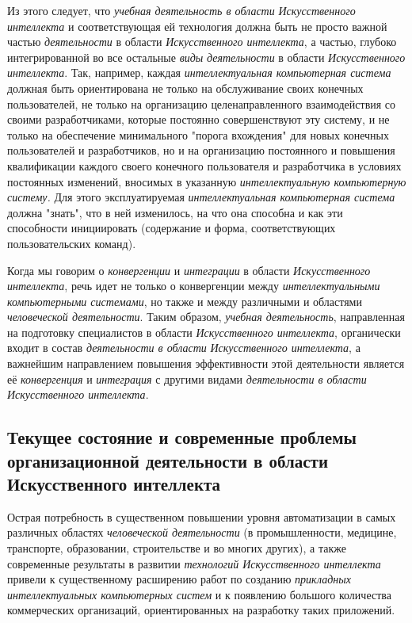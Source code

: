 Из этого следует, что \textit{учебная деятельность в области} \textit{Искусственного интеллекта} и соответствующая ей технология должна быть не просто важной частью \textit{деятельности} в области \textit{Искусственного интеллекта}, а частью, глубоко интегрированной во все остальные \textit{виды} \textit{деятельности} в области \textit{Искусственного интеллекта}. Так, например, каждая \textit{интеллектуальная компьютерная система} должная быть ориентирована не только на обслуживание своих конечных пользователей, не только на организацию целенаправленного взаимодействия со своими разработчиками, которые постоянно совершенствуют эту систему, и не только на обеспечение минимального "порога вхождения"{} для новых конечных пользователей и разработчиков, но и на организацию постоянного и  повышения квалификации каждого своего конечного пользователя и разработчика в условиях постоянных изменений, вносимых в указанную \textit{интеллектуальную компьютерную систему.} Для этого эксплуатируемая \textit{интеллектуальная компьютерная система} должна "знать"{}, что в ней изменилось, на что она способна и как эти способности инициировать (содержание и форма, соответствующих пользовательских команд).

Когда мы говорим о \textit{конвергенции} и \textit{интеграции} в области \textit{Искусственного интеллекта}, речь идет не только о конвергенции между \textit{интеллектуальными компьютерными системами}, но также и между различными  и областями \textit{человеческой деятельности}. Таким образом, \textit{учебная деятельность}, направленная на подготовку специалистов в области \textit{Искусственного интеллекта}, органически входит в состав \textit{деятельности в области} \textit{Искусственного интеллекта}, а важнейшим направлением повышения эффективности этой деятельности является её \textit{конвергенция} и \textit{интеграция} с другими видами \textit{деятельности в области Искусственного интеллекта}.

\subsection{Текущее состояние и современные проблемы организационной деятельности в области Искусственного интеллекта}
\label{subsec_current_state_and_modern_problems_organizational_activity}

Острая потребность в существенном повышении уровня автоматизации в самых различных областях \textit{человеческой деятельности} (в промышленности, медицине, транспорте, образовании, строительстве и во многих других), а также современные результаты в развитии \textit{технологий Искусственного интеллекта} привели к существенному расширению работ по созданию \textit{прикладных интеллектуальных компьютерных систем} и к появлению большого количества коммерческих организаций, ориентированных на разработку таких приложений.


